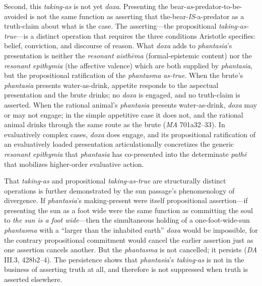 \documentclass{article}
\begin{document}
Second, this \textit{taking-as} is not yet \textit{doxa}. Presenting the bear-\textit{as}-predator-to-be-avoided is not the same function as asserting that the-bear-\textit{IS}-a-predator as a truth-claim about what is the case. The asserting---the propositional \textit{taking-as-true}---is a distinct operation that requires the three conditions Aristotle specifies: belief, conviction, and discourse of reason. What \textit{doxa} adds to \textit{phantasia}'s presentation is neither the \textit{resonant aisthēma} (formal-epistemic content) nor the \textit{resonant epithymia} (the affective valence) which are both supplied by \textit{phantasia}, but the propositional ratification of the \textit{phantasma} \textit{as-true}. When the brute's \textit{phantasia} presents water-as-drink, appetite responds to the aspectual presentation and the brute drinks; no \textit{doxa} is engaged, and no truth-claim is asserted. When the rational animal's \textit{phantasia} presents water-as-drink, \textit{doxa} may or may not engage; in the simple appetitive case it does not, and the rational animal drinks through the same route as the brute (\textit{MA} 701a32--33). In evaluatively complex cases, \textit{doxa} does engage, and its propositional ratification of an evaluatively loaded presentation articulationally concretizes the generic \textit{resonant epithymia} that \textit{phantasia} has co-presented into the determinate \textit{pathē} that mobilizes higher-order evaluative action.

That \textit{taking-as} and propositional \textit{taking-as-true} are structurally distinct operations is further demonstrated by the sun passage's phenomenology of divergence. If \textit{phantasia}'s making-present were itself propositional assertion---if presenting the sun as a foot wide were the same function as committing the soul to \textit{the sun is a foot wide}---then the simultaneous holding of a one-foot-wide-sun \textit{phantasma} with a ``larger than the inhabited earth'' \textit{doxa} would be impossible, for the contrary propositional commitment would cancel the earlier assertion just as one assertion cancels another. But the \textit{phantasma} is not cancelled; it persists (\textit{DA} III.3, 428b2--4). The persistence shows that \textit{phantasia}'s \textit{taking-as} is not in the business of asserting truth at all, and therefore is not suppressed when truth is asserted elsewhere.
\end{document}
